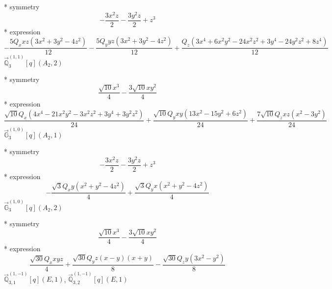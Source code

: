 \documentclass[fleqn,8pt]{jsarticle}
\begin{document}
\noindent\quad ** symmetry
\begin{dmath*}
- \frac{3 x^{2} z}{2} - \frac{3 y^{2} z}{2} + z^{3}
\end{dmath*}
\noindent\quad ** expression
\begin{dmath*}
- \frac{5 Q_{x} x z \left(3 x^{2} + 3 y^{2} - 4 z^{2}\right)}{12} - \frac{5 Q_{y} y z \left(3 x^{2} + 3 y^{2} - 4 z^{2}\right)}{12} + \frac{Q_{z} \left(3 x^{4} + 6 x^{2} y^{2} - 24 x^{2} z^{2} + 3 y^{4} - 24 y^{2} z^{2} + 8 z^{4}\right)}{12}
\end{dmath*}
\noindent\quad $\vec{\mathbb{Q}}_{3}^{(1,1)}[q](A_{2},2)$

\noindent\quad ** symmetry
\begin{dmath*}
\frac{\sqrt{10} x^{3}}{4} - \frac{3 \sqrt{10} x y^{2}}{4}
\end{dmath*}
\noindent\quad ** expression
\begin{dmath*}
\frac{\sqrt{10} Q_{x} \left(4 x^{4} - 21 x^{2} y^{2} - 3 x^{2} z^{2} + 3 y^{4} + 3 y^{2} z^{2}\right)}{24} + \frac{\sqrt{10} Q_{y} x y \left(13 x^{2} - 15 y^{2} + 6 z^{2}\right)}{24} + \frac{7 \sqrt{10} Q_{z} x z \left(x^{2} - 3 y^{2}\right)}{24}
\end{dmath*}
\noindent\quad $\vec{\mathbb{G}}_{3}^{(1,0)}[q](A_{2},1)$

\noindent\quad ** symmetry
\begin{dmath*}
- \frac{3 x^{2} z}{2} - \frac{3 y^{2} z}{2} + z^{3}
\end{dmath*}
\noindent\quad ** expression
\begin{dmath*}
- \frac{\sqrt{3} Q_{x} y \left(x^{2} + y^{2} - 4 z^{2}\right)}{4} + \frac{\sqrt{3} Q_{y} x \left(x^{2} + y^{2} - 4 z^{2}\right)}{4}
\end{dmath*}
\noindent\quad $\vec{\mathbb{G}}_{3}^{(1,0)}[q](A_{2},2)$

\noindent\quad ** symmetry
\begin{dmath*}
\frac{\sqrt{10} x^{3}}{4} - \frac{3 \sqrt{10} x y^{2}}{4}
\end{dmath*}
\noindent\quad ** expression
\begin{dmath*}
\frac{\sqrt{30} Q_{x} x y z}{4} + \frac{\sqrt{30} Q_{y} z \left(x - y\right) \left(x + y\right)}{8} - \frac{\sqrt{30} Q_{z} y \left(3 x^{2} - y^{2}\right)}{8}
\end{dmath*}
\noindent\quad $\vec{\mathbb{Q}}_{3,1}^{(1,-1)}[q](E,1)$, $\vec{\mathbb{Q}}_{3,2}^{(1,-1)}[q](E,1)$
\end{document}

